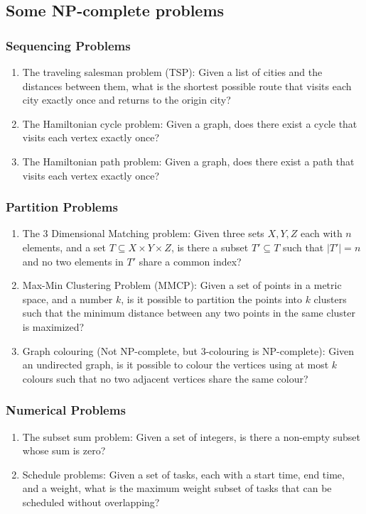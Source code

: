 \documentclass[conference]{IEEEtran}
\begin{document}
\subsection{Some NP-complete problems}
\subsubsection{Sequencing Problems}
\begin{enumerate}
    \item The traveling salesman problem (TSP): Given a list of cities and the distances between them, what is the shortest possible route that visits each city exactly once and returns to the origin city?
    \item The Hamiltonian cycle problem: Given a graph, does there exist a cycle that visits each vertex exactly once?
    \item The Hamiltonian path problem: Given a graph, does there exist a path that visits each vertex exactly once?
\end{enumerate}
\subsubsection{Partition Problems}
\begin{enumerate}
    \item The 3 Dimensional Matching problem: Given three sets $X, Y, Z$ each with $n$ elements, and a set $T \subseteq X \times Y \times Z$, is there a subset $T' \subseteq T$ such that $|T'| = n$ and no two elements in $T'$ share a common index?
    \item Max-Min Clustering Problem (MMCP): Given a set of points in a metric space, and a number $k$, is it possible to partition the points into $k$ clusters such that the minimum distance between any two points in the same cluster is maximized?
    \item Graph colouring (Not NP-complete, but 3-colouring is NP-complete): Given an undirected graph, is it possible to colour the vertices using at most $k$ colours such that no two adjacent vertices share the same colour?
\end{enumerate}
\subsubsection{Numerical Problems}
\begin{enumerate}
    \item The subset sum problem: Given a set of integers, is there a non-empty subset whose sum is zero?
    \item Schedule problems: Given a set of tasks, each with a start time, end time, and a weight, what is the maximum weight subset of tasks that can be scheduled without overlapping?
\end{enumerate}
\end{document}

